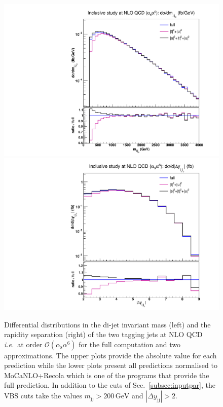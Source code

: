 \documentclass[twocolumn,epjc3]{svjour3} %
\newcommand{\Pj}{\ensuremath{\text{j}}\xspace}
\newcommand{\GeV}{\ensuremath{\,\text{GeV}}\xspace}
\newcommand{\alphas}{\ensuremath{\alpha_\text{s}}\xspace}
\begin{document}
    \begin{figure}
    \centering
    {\includegraphics[scale=0.35]{figures/scanfigures/mjj_nlo.pdf}}
    {\includegraphics[scale=0.35]{figures/scanfigures/dyjj_nlo.pdf}}
    \caption{
    Differential distributions in the di-jet invariant mass (left) and the rapidity separation (right) of the two tagging jets at NLO QCD \emph{i.e.}\ at order $\mathcal{O}(\alphas\alpha^6)$ for the full computation and two approximations.
    The upper plots provide the absolute value for each prediction while the lower plots present all predictions normalised to {\sc MoCaNLO}+{\sc Recola} which is one of the programs that provide the full prediction.
    In addition to the cuts of Sec.~\protect\ref{subsec:inputpar}, the VBS cuts take the values $m_{\Pj\Pj}>200 \GeV$ and $|\Delta y_{\Pj\Pj}|>2$.} 
    \label{fig:mjjdyjj_1d_1}
    \end{figure}
\end{document}
